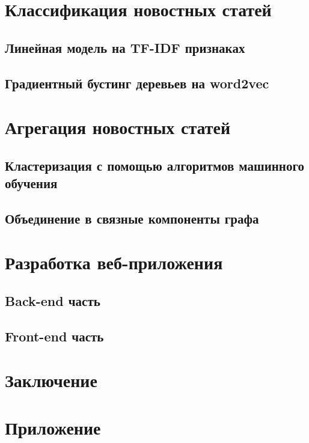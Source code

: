\documentclass[a4paper, 14pt]{extarticle}
\begin{document}
\section{Классификация новостных статей}
\subsection{Линейная модель на TF-IDF признаках}
\subsection{Градиентный бустинг деревьев на word2vec}
\section{Агрегация новостных статей}
\subsection{Кластеризация с помощью алгоритмов машинного обучения}
\subsection{Объединение в связные компоненты графа}
\section{Разработка веб-приложения}
\subsection{Back-end часть}
\subsection{Front-end часть}
\section{Заключение}


\setcounter{secnumdepth}{0}
\section{Приложение}
\end{document}

